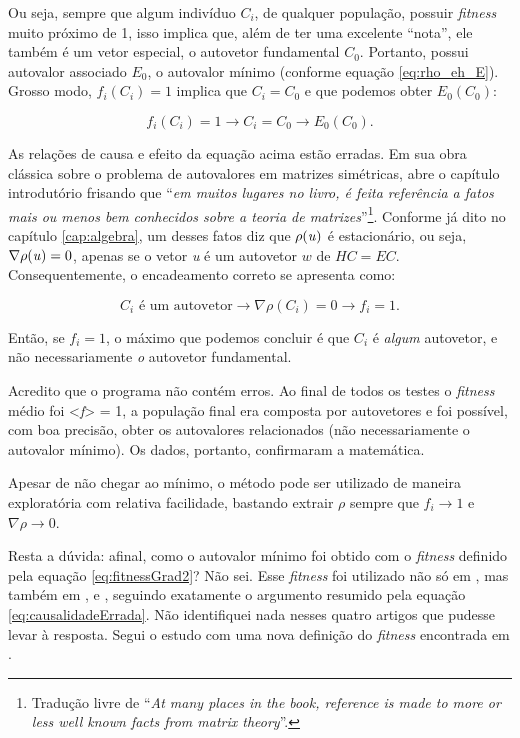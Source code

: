Ou seja, sempre que algum indivíduo $C_i$, de qualquer população, possuir \textit{fitness} muito próximo de 1, isso implica que, além de ter uma excelente ``nota'', ele também é um vetor especial, o autovetor fundamental $C_0$. Portanto, possui autovalor associado $E_0$, o autovalor mínimo (conforme equação \ref{eq:rho_eh_E}). Grosso modo, $f_i(C_i) = 1$ implica que $C_i = C_0$ e que podemos obter $E_0(C_0)$:

\begin{equation}\label{eq:causalidadeErrada}
	f_i(C_i) = 1 \rightarrow C_i = C_0 \rightarrow E_0(C_0).
\end{equation}

As relações de causa e efeito da equação acima estão erradas. Em sua obra clássica sobre o problema de autovalores em matrizes simétricas, \cite{Parlett1998} abre o capítulo introdutório frisando que ``\textit{em muitos lugares no livro, é feita referência a fatos mais ou menos bem conhecidos sobre a teoria de matrizes}''\footnote{Tradução livre de ``\textit{At many places in the book, reference is made to more or less well known facts from matrix theory}''.}. Conforme já dito no capítulo \ref{cap:algebra}, um desses fatos diz que $\rho(\mbox{\textit{u}})$ é estacionário, ou seja, $\nabla \rho(\mbox{\textit{u}}) = 0$, apenas se o vetor \textit{u} é um autovetor $w$ de $HC = EC$. Consequentemente, o encadeamento correto se apresenta como:

\begin{equation}\label{eq:causalidadeCorreta}
	C_i \mbox{ é um autovetor} \rightarrow \nabla \rho(C_i) = 0 \rightarrow f_i = 1.
\end{equation}
	
Então, se $f_i = 1$, o máximo que podemos concluir é que $C_i$ é \textit{algum} autovetor, e não necessariamente \textit{o} autovetor fundamental.

Acredito que o programa não contém erros. Ao final de todos os testes o \textit{fitness} médio foi <\textit{f}> = 1, a população final era composta por autovetores e foi possível, com boa precisão, obter os autovalores relacionados (não necessariamente o autovalor mínimo). Os dados, portanto, confirmaram a matemática.

Apesar de não chegar ao mínimo, o método pode ser utilizado de maneira exploratória com relativa facilidade, bastando extrair $\rho$ sempre que $f_i \rightarrow 1$ e $\nabla \rho \rightarrow 0$. 

Resta a dúvida: afinal, como o autovalor mínimo foi obtido com o \textit{fitness} definido pela equação \ref{eq:fitnessGrad2}? Não sei. Esse \textit{fitness} foi utilizado não só em \cite{metodo2004}, mas também em \cite{metodo2006}, \cite{metodo2008} e \cite{metodo2009}, seguindo exatamente o argumento resumido pela equação \ref{eq:causalidadeErrada}. Não identifiquei nada nesses quatro artigos que pudesse levar à resposta. Segui o estudo com uma nova definição do \textit{fitness} encontrada em \cite{metodo2011}.

